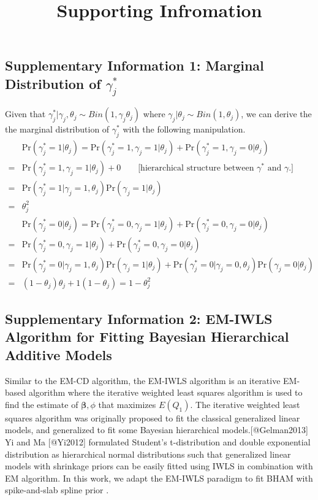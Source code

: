 \documentclass[
]{article}
\title{Supporting Infromation}
\author{}
\date{\vspace{-2.5em}}
\begin{document}
\maketitle

\newcommand{\tp}{*}
\newcommand{\pr}{\text{Pr}}
\newcommand{\bs}[1]{\boldsymbol{#1}}

\subsection{Supplementary Information 1: Marginal Distribution of $\gamma_j^*$}

Given that
\(\gamma_{j}^*| \gamma_{j}, \theta_j \sim Bin(1, \gamma_{j}\theta_j)\)
where \(\gamma_{j} | \theta_j \sim Bin(1, \theta_j)\), we can derive the
the marginal distribution of \(\gamma_{j}^*\) with the following
manipulation. \begin{align*}
& \text{Pr}(\gamma_j^*= 1 | \theta_j)  = \text{Pr}(\gamma_j^*= 1, \gamma_j = 1 | \theta_j) + \text{Pr}(\gamma_j^*= 1 , \gamma_j = 0| \theta_j)\\
= & \text{Pr}(\gamma_j^*= 1, \gamma_j = 1 | \theta_j) + 0 \qquad \text{[hierarchical structure between }\gamma^*\text{ and }\gamma \text{.]}\\
= & \text{Pr}(\gamma_j^*= 1| \gamma_j = 1,  \theta_j)\text{Pr}(\gamma_j = 1| \theta_j)\\
= & \theta_j^2\\
& \text{Pr}(\gamma_j^*= 0 | \theta_j)  = \text{Pr}(\gamma_j^*= 0, \gamma_j = 1 | \theta_j) + \text{Pr}(\gamma_j^*= 0 , \gamma_j = 0| \theta_j)\\
= & \text{Pr}(\gamma_j^*= 0, \gamma_j = 1 | \theta_j) + \text{Pr}(\gamma_j^*= 0, \gamma_j = 0 | \theta_j)\\
= & \text{Pr}(\gamma_j^*= 0| \gamma_j = 1,  \theta_j)\text{Pr}(\gamma_j = 1| \theta_j) + \text{Pr}(\gamma_j^*= 0| \gamma_j = 0,  \theta_j)\text{Pr}(\gamma_j = 0| \theta_j)\\
= & (1-\theta_j)\theta_j + 1(1-\theta_j) = 1-\theta_j^2
\end{align*}

\clearpage

\subsection{Supplementary Information 2: EM-IWLS Algorithm for Fitting Bayesian Hierarchical Additive Models}

Similar to the EM-CD algorithm, the EM-IWLS algorithm is an iterative
EM-based algorithm where the iterative weighted least squares algorithm
is used to find the estimate of \(\boldsymbol{\beta}, \phi\) that
maximizes \(E(Q_1)\). The iterative weighted least squares algorithm was
originally proposed to fit the classical generalized linear models, and
generalized to fit some Bayesian hierarchical models.{[}@Gelman2013{]}
Yi and Ma {[}@Yi2012{]} formulated Student's t-distribution and double
exponential distribution as hierarchical normal distributions such that
generalized linear models with shrinkage priors can be easily fitted
using IWLS in combination with EM algorithm. In this work, we adapt the
EM-IWLS paradigm to fit BHAM with spike-and-slab spline prior .
\end{document}
